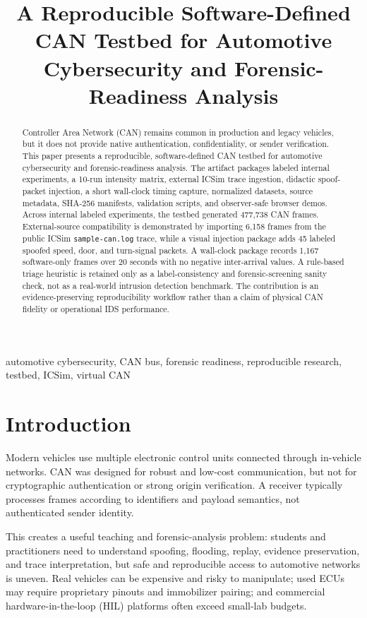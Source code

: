 \documentclass[conference]{IEEEtran}
\title{A Reproducible Software-Defined CAN Testbed for Automotive Cybersecurity and Forensic-Readiness Analysis}
\author{\IEEEauthorblockN{Osvaldo Janeri Filho}
\IEEEauthorblockA{Independent Researcher / Digital Forensics Practitioner\\
Fortaleza, Cear\'{a}, Brazil\\
Email omitted for blind or camera-ready submission}}
\begin{document}
\maketitle

\begin{abstract}
Controller Area Network (CAN) remains common in production and legacy vehicles, but it does not provide native authentication, confidentiality, or sender verification. This paper presents a reproducible, software-defined CAN testbed for automotive cybersecurity and forensic-readiness analysis. The artifact packages labeled internal experiments, a 10-run intensity matrix, external ICSim trace ingestion, didactic spoof-packet injection, a short wall-clock timing capture, normalized datasets, source metadata, SHA-256 manifests, validation scripts, and observer-safe browser demos. Across internal labeled experiments, the testbed generated 477,738 CAN frames. External-source compatibility is demonstrated by importing 6,158 frames from the public ICSim \texttt{sample-can.log} trace, while a visual injection package adds 45 labeled spoofed speed, door, and turn-signal packets. A wall-clock package records 1,167 software-only frames over 20 seconds with no negative inter-arrival values. A rule-based triage heuristic is retained only as a label-consistency and forensic-screening sanity check, not as a real-world intrusion detection benchmark. The contribution is an evidence-preserving reproducibility workflow rather than a claim of physical CAN fidelity or operational IDS performance.
\end{abstract}

\begin{IEEEkeywords}
automotive cybersecurity, CAN bus, forensic readiness, reproducible research, testbed, ICSim, virtual CAN
\end{IEEEkeywords}

\section{Introduction}
Modern vehicles use multiple electronic control units connected through in-vehicle networks. CAN was designed for robust and low-cost communication, but not for cryptographic authentication or strong origin verification. A receiver typically processes frames according to identifiers and payload semantics, not authenticated sender identity.

This creates a useful teaching and forensic-analysis problem: students and practitioners need to understand spoofing, flooding, replay, evidence preservation, and trace interpretation, but safe and reproducible access to automotive networks is uneven. Real vehicles can be expensive and risky to manipulate; used ECUs may require proprietary pinouts and immobilizer pairing; and commercial hardware-in-the-loop (HIL) platforms often exceed small-lab budgets.
\end{document}
